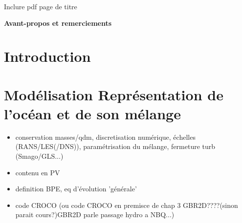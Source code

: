 \documentclass[a4paper,12pt,notitlepage]{report}
\numberwithin{equation}{section}
\begin{document}

\hypersetup{pdfborder=0 0 0}%
\let\noparref\ref
\renewcommand{\ref}[1]{(\noparref{#1})}

\setcounter{tocdepth}{3}%

Inclure pdf page de titre

\newpage
\textbf{Avant-propos et remerciements}
\newpage
\tableofcontents


\newpage
\chapter{Introduction}
\citet{armi_1985}






\chapter{Mod\'elisation  Repr\'esentation de l'oc\'ean et de son m\'elange}
\begin{itemize}
\item conservation masses/qdm, discretisation numérique, échelles (RANS/LES(/DNS)), paramétrisation du mélange, fermeture turb (Smago/GLS...)
\item contenu en PV
\item definition BPE, eq d'évolution 'générale'
\item code CROCO (ou code CROCO en premisce de chap 3 GBR2D????(sinon parait cours?)GBR2D parle passage hydro a NBQ...)
\end{itemize}



\end{document}
